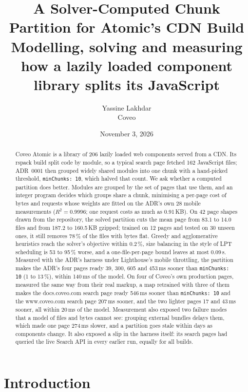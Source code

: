 \documentclass[11pt]{article}
\title{A Solver-Computed Chunk Partition for Atomic's CDN Build\\[6pt]
\large Modelling, solving and measuring how a lazily loaded component library splits its JavaScript}
\author{Yassine Lakhdar\\Coveo}
\date{November 3, 2026}
\newcommand{\code}[1]{\texttt{#1}}
\begin{document}
\maketitle

\begin{abstract}
Coveo Atomic is a library of 206 lazily loaded web components served from a CDN. Its rspack build split code by module, so a typical search page fetched 162 JavaScript files; ADR~0001 then grouped widely shared modules into one chunk with a hand-picked threshold, \code{minChunks: 10}, which halved that count. We ask whether a computed partition does better. Modules are grouped by the set of pages that use them, and an integer program decides which groups share a chunk, minimising a per-page cost of bytes and requests whose weights are fitted on the ADR's own 28 mobile measurements ($R^2 = 0.9996$; one request costs as much as 0.91\,KB). On 42 page shapes drawn from the repository, the solved partition cuts the mean page from 83.1 to 14.0 files and from 187.2 to 160.5\,KB gzipped; trained on 12 pages and tested on 30 unseen ones, it still removes 78\,\% of the files with bytes flat. Greedy and agglomerative heuristics reach the solver's objective within 0.2\,\%, size balancing in the style of LPT scheduling is 53 to 95\,\% worse, and a one-file-per-page bound leaves at most 0.09\,s. Measured with the ADR's harness under Lighthouse's mobile throttling, the partition makes the ADR's four pages ready 39, 300, 605 and 453\,ms sooner than \code{minChunks: 10} (1 to 13\,\%), within 140\,ms of the model. On four of Coveo's own production pages, measured the same way from their real markup, a map retrained with three of them makes the docs.coveo.com search page ready 546\,ms sooner than \code{minChunks: 10} and the www.coveo.com search page 207\,ms sooner, and the two lighter pages 17 and 43\,ms sooner, all within 20\,ms of the model. Measurement also exposed two failure modes that a model of files and bytes cannot see: grouping external bundles delays them, which made one page 274\,ms slower, and a partition goes stale within days as components change. It also exposed a slip in the harness itself: its search pages had queried the live Search API in every earlier run, equally for all builds.
\end{abstract}

\section{Introduction}\label{sec:intro}
\end{document}

